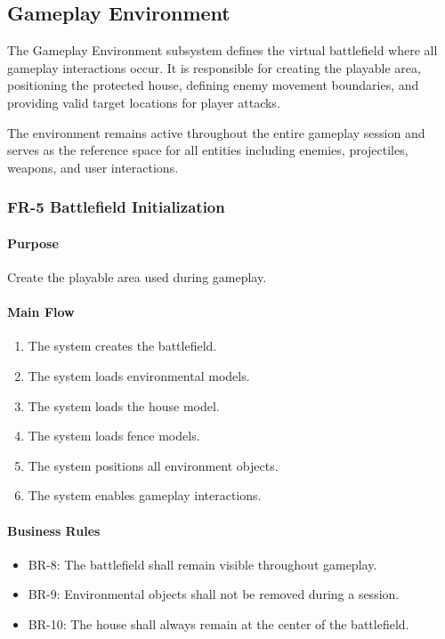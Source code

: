 \documentclass[11pt,a4paper]{article}
\begin{document}
\subsection{Gameplay Environment}

The Gameplay Environment subsystem defines the virtual battlefield where all
gameplay interactions occur. It is responsible for creating the playable area,
positioning the protected house, defining enemy movement boundaries, and
providing valid target locations for player attacks.

The environment remains active throughout the entire gameplay session and serves
as the reference space for all entities including enemies, projectiles, weapons,
and user interactions.

\subsubsection{FR-5 Battlefield Initialization}

\paragraph{Purpose}
Create the playable area used during gameplay.

\paragraph{Main Flow}
\begin{enumerate}
  \item The system creates the battlefield.
  \item The system loads environmental models.
  \item The system loads the house model.
  \item The system loads fence models.
  \item The system positions all environment objects.
  \item The system enables gameplay interactions.
\end{enumerate}

\paragraph{Business Rules}
\begin{itemize}
  \item BR-8: The battlefield shall remain visible throughout gameplay.
  \item BR-9: Environmental objects shall not be removed during a session.
  \item BR-10: The house shall always remain at the center of the battlefield.
\end{itemize}
\end{document}
